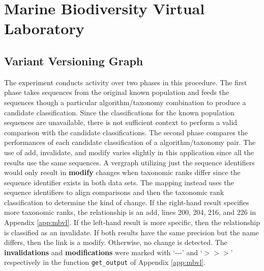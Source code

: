 \section{Marine Biodiversity Virtual Laboratory}

\subsection{Variant Versioning Graph}

The experiment conducts activity over two phases in this procedure.
The first phase takes sequences from the original known population and feeds the sequences though a particular algorithm/taxonomy combination to produce a candidate classification.
Since the classifications for the known population sequences are unavailable, there is not sufficient context to perform a valid comparison with the candidate classifications.
The second phase compares the performances of each candidate classification of a algorithm/taxonomy pair.
The use of \gls{add}, \gls{invalidate}, and \gls{modify} varies slightly in this application since all the results use the same sequences.
A \gls{vergraph} utilizing just the sequence identifiers would only result in \textbf{modify} changes when taxonomic ranks differ since the sequence identifier exists in both data sets.
The mapping instead uses the sequence identifiers to align comparisons and then the taxonomic rank classification to determine the kind of \gls{change}.
If the right-hand result specifies more taxonomic ranks, the relationship is an \gls{add}, lines 200, 204, 216, and 226 in Appendix \ref{app:mbvl}.
If the left-hand result is more specific, then the relationship is classified as an \gls{invalidate}.
If both results have the same precision but the name differs, then the link is a \gls{modify}.
Otherwise, no \gls{change} is detected.
The \textbf{invalidations} and \textbf{modifications} were marked with `-{}-{}-' and `$>$$>$$>$' respectively in the function \texttt{get_output} of Appendix \ref{app:mbvl}.

